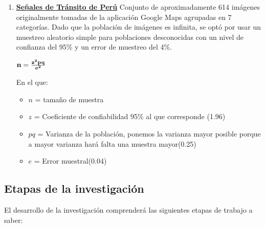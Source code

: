 		
		\begin{enumerate}
			\item[]  {\bf \underline {Señales de Tránsito de Perú}}\newline
			Conjunto de aproximadamente 614 imágenes originalmente tomadas de la aplicación Google Maps agrupadas en 7 categorías. Dado que la población de imágenes es infinita, se optó por usar un muestreo aleatorio simple para poblaciones desconocidas con un nivel de confianza del 95\% y un error de muestreo del 4\%.
		
			\vskip 0.4cm
			\begingroup\makeatletter{}\check@mathfonts
			\begin{center}
				${\bf n} ={\bf \frac{z^2pq}{e^2}}$
			\end{center}
			\endgroup
		
			En el que:\vskip 0.1cm
			\begin{itemize}
				\item $n$ = tamaño de muestra
				\item $z$ = Coeficiente de confiabilidad 95\% al que corresponde (1.96)
				\item $pq$ = Varianza de la población, ponemos la varianza mayor posible porque a mayor varianza hará falta una muestra mayor(0.25)
				\item $e$ = Error muestral(0.04)
			\end{itemize}
		\end{enumerate}

\subsection{Etapas de la investigación} 
	El desarrollo de la investigación comprenderá las siguientes etapas de trabajo a saber:

